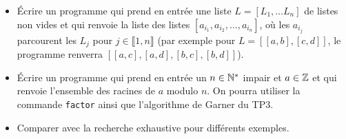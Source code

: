 \documentclass[11pt,a4paper]{article}
\begin{document}
\begin{itemize}
\item[•] Écrire un programme qui prend en entrée une liste $L=[L_1,\ldots L_n]$ de listes non vides et qui renvoie la liste des  listes $[a_{i_1},a_{i_2}, \ldots,a_{i_n}]$, où les $a_{i_j}$ parcourent les $L_j$ pour $j\in \llbracket 1,n\rrbracket$ (par exemple pour $L=[[a,b],[c,d]]$, le programme renverra $[[a,c],[a,d],[b,c],[b,d]]$).

\item[•] Écrire un programme qui prend en entrée un $n\in\mathbb{N}^*$ impair et $a\in \mathbb{Z}$ et qui renvoie l'ensemble des racines de $a$ modulo $n$. On pourra utiliser la commande \texttt{factor} ainsi que l'algorithme de Garner du TP3.

\item[•] Comparer avec la recherche exhaustive pour différents exemples.
\end{itemize}
\end{document}

